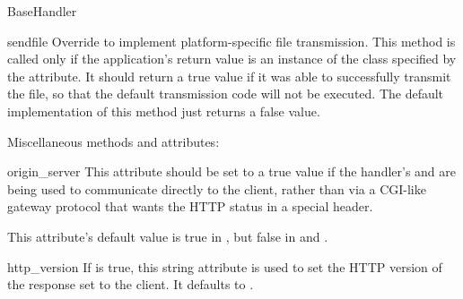 \begin{classdesc}{BaseHandler}{}
\begin{methoddesc}{sendfile}{}
Override to implement platform-specific file transmission.  This method
is called only if the application's return value is an instance of
the class specified by the  attribute.  It
should return a true value if it was able to successfully transmit the
file, so that the default transmission code will not be executed.
The default implementation of this method just returns a false value.
\end{methoddesc}


Miscellaneous methods and attributes:

\begin{memberdesc}{origin_server}
This attribute should be set to a true value if the handler's
 and  are being used to communicate
directly to the client, rather than via a CGI-like gateway protocol that
wants the HTTP status in a special  header.

This attribute's default value is true in , but
false in  and .
\end{memberdesc}

\begin{memberdesc}{http_version}
If  is true, this string attribute is used to
set the HTTP version of the response set to the client.  It defaults to
.
\end{memberdesc}





\end{classdesc}








































